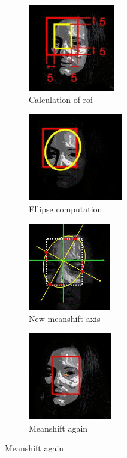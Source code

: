 \documentclass[11pt,a4paper]{article}
\begin{document}
\begin{itemize}
\begin{figure}[h!]
\end{figure}
 \begin{figure}[h!]
 \begin{subfigure}{0.5\textwidth}
\includegraphics[width=0.9\linewidth, height=3.8cm]{roiforellipse.png}
\caption{Calculation of roi}
\end{subfigure}
\begin{subfigure}{0.5\textwidth}
\includegraphics[width=0.9\linewidth, height=3.8cm]{ellipsecomputation.png}
\caption{Ellipse computation}
\end{subfigure}
\begin{subfigure}{0.5\textwidth}
\includegraphics[width=0.9\linewidth, height=3.8cm]{newmeanshiftaxis.png} 
\caption{New meanshift axis}
\end{subfigure}
\begin{subfigure}{0.5\textwidth}
\includegraphics[width=0.9\linewidth, height=3.8cm]{meanshiftagain.png}
\caption{Meanshift again}
\end{subfigure}

\end{figure}
\end{itemize}
\end{document}
